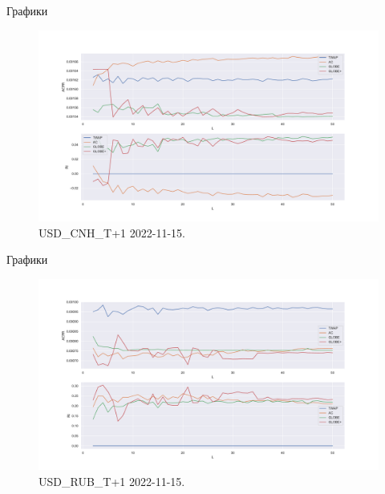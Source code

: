 \documentclass[aspectratio=169]{beamer}
\begin{document}
    \begin{frame}{Графики}
    
        \begin{figure}  
            \centering
            \includegraphics[width=0.83\linewidth]{USD_CNH_T+1 2022-11-15 T = 50 W = 500}
            \caption{USD\_CNH\_T+1 2022-11-15. }
        \end{figure}

    \end{frame}

    \begin{frame}{Графики}
    
        \begin{figure}  
            \centering
            \includegraphics[width=0.83\linewidth]{USD_RUB_T+1 2022-10-20 T = 50 W = 500}
            \caption{USD\_RUB\_T+1 2022-11-15. }
        \end{figure}

    \end{frame}
\end{document}
